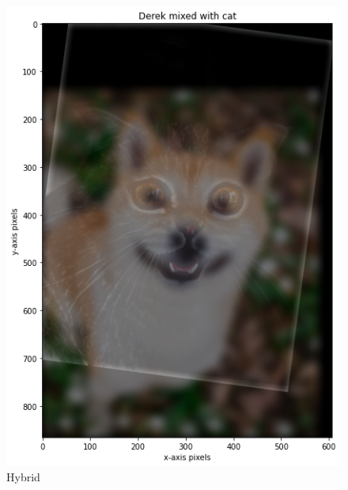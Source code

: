 \documentclass{article}
\begin{document}
\begin{figure}[!htb]
    \includegraphics[width=\linewidth]{dogcat.png}
    \caption{Hybrid}\label{fig:awesome_image2}
\endminipage
\end{figure}
\end{document}

